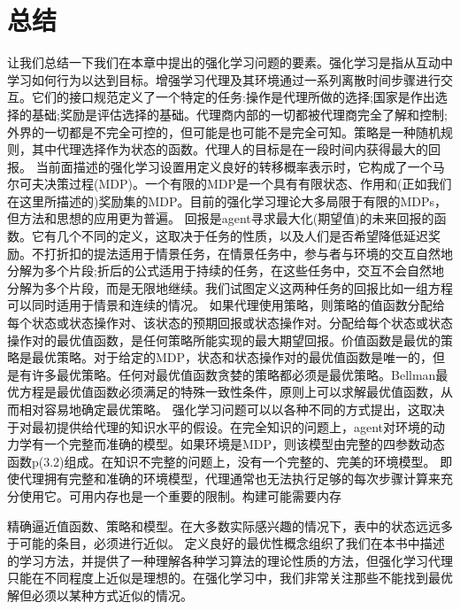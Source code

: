 \section{总结}

让我们总结一下我们在本章中提出的强化学习问题的要素。强化学习是指从互动中学习如何行为以达到目标。增强学习代理及其环境通过一系列离散时间步骤进行交互。它们的接口规范定义了一个特定的任务:操作是代理所做的选择;国家是作出选择的基础;奖励是评估选择的基础。代理商内部的一切都被代理商完全了解和控制;外界的一切都是不完全可控的，但可能是也可能不是完全可知。策略是一种随机规则，其中代理选择作为状态的函数。代理人的目标是在一段时间内获得最大的回报。
当前面描述的强化学习设置用定义良好的转移概率表示时，它构成了一个马尔可夫决策过程(MDP)。一个有限的MDP是一个具有有限状态、作用和(正如我们在这里所描述的)奖励集的MDP。目前的强化学习理论大多局限于有限的MDPs，但方法和思想的应用更为普遍。
回报是agent寻求最大化(期望值)的未来回报的函数。它有几个不同的定义，这取决于任务的性质，以及人们是否希望降低延迟奖励。不打折扣的提法适用于情景任务，在情景任务中，参与者与环境的交互自然地分解为多个片段;折后的公式适用于持续的任务，在这些任务中，交互不会自然地分解为多个片段，而是无限地继续。我们试图定义这两种任务的回报比如一组方程可以同时适用于情景和连续的情况。
如果代理使用策略，则策略的值函数分配给每个状态或状态操作对、该状态的预期回报或状态操作对。分配给每个状态或状态操作对的最优值函数，是任何策略所能实现的最大期望回报。价值函数是最优的策略是最优策略。对于给定的MDP，状态和状态操作对的最优值函数是唯一的，但是有许多最优策略。任何对最优值函数贪婪的策略都必须是最优策略。Bellman最优方程是最优值函数必须满足的特殊一致性条件，原则上可以求解最优值函数，从而相对容易地确定最优策略。
强化学习问题可以以各种不同的方式提出，这取决于对最初提供给代理的知识水平的假设。在完全知识的问题上，agent对环境的动力学有一个完整而准确的模型。如果环境是MDP，则该模型由完整的四参数动态函数p(3.2)组成。在知识不完整的问题上，没有一个完整的、完美的环境模型。
即使代理拥有完整和准确的环境模型，代理通常也无法执行足够的每次步骤计算来充分使用它。可用内存也是一个重要的限制。构建可能需要内存

精确逼近值函数、策略和模型。在大多数实际感兴趣的情况下，表中的状态远远多于可能的条目，必须进行近似。
定义良好的最优性概念组织了我们在本书中描述的学习方法，并提供了一种理解各种学习算法的理论性质的方法，但强化学习代理只能在不同程度上近似是理想的。在强化学习中，我们非常关注那些不能找到最优解但必须以某种方式近似的情况。

